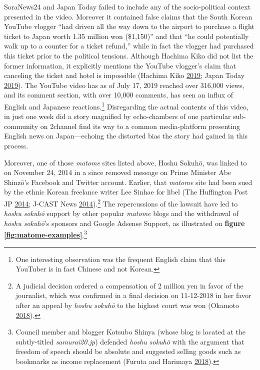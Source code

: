 \documentclass[10pt,british,A4paper,,openany]{memoir}
\begin{document}
SoraNews24 and Japan Today failed to include any of the socio-political
context presented in the video. Moreover it contained false claims that
the South Korean YouTube vlogger ``had driven all the way down to the
airport to purchase a flight ticket to Japan worth 1.35 million won
(\$1,150)'' and that ``he could potentially walk up to a counter for a
ticket refund,'' while in fact the vlogger had purchased this ticket
prior to the political tensions. Although Hachima Kiko did not list the
former information, it explicitly mentions the YouTube vlogger's claim
that canceling the ticket and hotel is impossible (Hachima Kiko
\protect\hyperlink{ref-hachima_kiko_eng:_2019}{2019}; Japan Today
\protect\hyperlink{ref-japan_today_popular_2019}{2019}). The YouTube
video has as of July 17, 2019 reached over 316,000 views, and its
comment section, with over 10,000 comments, has seen an influx of
English and Japanese reactions.\footnote{One interesting observation was
  the frequent English claim that this YouTuber is in fact Chinese and
  not Korean.} Disregarding the actual contents of this video, in just
one week did a story magnified by echo-chambers of one particular
sub-community on 2channel find its way to a common media-platform
presenting English news on Japan---echoing the distorted bias the story
had gained in this process.

Moreover, one of those \emph{matome} sites listed above, Hoshu Sokuhō,
was linked to on November 24, 2014 in a since removed message on Prime
Minister Abe Shinzō's Facebook and Twitter account. Earlier, that
\emph{matome} site had been sued by the ethnic Korean freelance writer
Lee Sinhae for libel (The Huffington Post JP
\protect\hyperlink{ref-the_huffington_post_jp_lee_2014}{2014}; J-CAST
News \protect\hyperlink{ref-j-cast_news_eng:_2014}{2014}).\footnote{A
  judicial decision ordered a compensation of 2 million yen in favor of
  the journalist, which was confirmed in a final decision on 11-12-2018
  in her favor after an appeal by \emph{hoshu sokuhō} to the highest
  court was won (Okamoto
  \protect\hyperlink{ref-okamoto_eng:_2018}{2018}).} The repercussions
of the lawsuit have led to \emph{hoshu sokuhō} support by other popular
\emph{matome} blogs and the withdrawal of \emph{hoshu sokuhō}'s sponsors
and Google Adsense Support, as illustrated on \textbf{figure
\ref{fig:matome-examples}}.\footnote{Council member and blogger Kotsubo
  Shinya (whose blog is located at the subtly-titled
  \emph{samurai20.jp}) defended \emph{hoshu sokuhō} with the argument
  that freedom of speech should be absolute and suggested selling goods
  such as bookmarks as income replacement (Furuta and Harimaya
  \protect\hyperlink{ref-furuta_eng:_2018}{2018}).}
\end{document}
